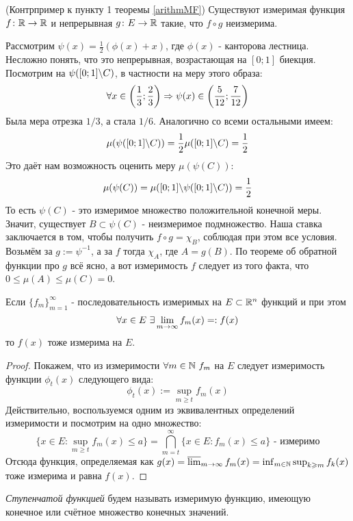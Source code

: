 \begin{example} (Контрпример к пункту 1 теоремы \ref{arithmMF})
	Существуют измеримая функция $f \colon \mathbb{R} \to \mathbb{R}$ и непрерывная $g \colon E \to \mathbb{R}$ такие, что $f \circ g$ неизмерима.
	
	Рассмотрим $\psi(x) = \frac{1}{2}(\phi(x) + x)$, где $\phi(x)$ - канторова лестница. Несложно понять, что это непрерывная, возрастающая на $[0; 1]$ биекция. Посмотрим на $\psi([0; 1] \backslash C)$, в частности на меру этого образа:
	\[
		\forall x \in \left(\frac{1}{3}; \frac{2}{3}\right) \Rightarrow \psi(x) \in \left(\frac{5}{12}; \frac{7}{12}\right)
	\]
	Была мера отрезка $1/3$, а стала $1/6$. Аналогично со всеми остальными имеем:
	\[
		\mu(\psi([0; 1] \backslash C)) = \frac{1}{2}\mu([0; 1] \backslash C) = \frac{1}{2}
	\]
	Это даёт нам возможность оценить меру $\mu(\psi(C))$:
	\[
		\mu(\psi(C)) = \mu([0; 1] \backslash \psi([0; 1] \backslash C)) = \frac{1}{2}
	\]
	То есть $\psi(C)$ - это измеримое множество положительной конечной меры. Значит, существует $B \subset \psi(C)$ - неизмеримое подмножество. Наша ставка заключается в том, чтобы получить $f \circ g = \chi_B$, соблюдая при этом все условия. Возьмём за $g := \psi^{-1}$, а за $f$ тогда $\chi_A$, где $A = g(B)$. По теореме об обратной функции про $g$ всё ясно, а вот измеримость $f$ следует из того факта, что $0 \le \mu(A) \le \mu(C) = 0$.
\end{example}

\begin{theorem}
	Если $\{f_m\}_{m = 1}^\infty$ - последовательность измеримых на $E \subset \mathbb{R}^n$ функций и при этом
	\[
		\forall x \in E\ \exists \lim\limits_{m \to \infty} f_m(x) =: f(x)
	\]
	то $f(x)$ тоже измерима на $E$.
\end{theorem}

\begin{proof}
	Покажем, что из измеримости $\forall m \in \mathbb{N}\ f_m$ на $E$ следует измеримость функции $\phi_t(x)$ следующего вида:
	\[
		\phi_t(x) := \sup_{m \ge t} f_m(x)
	\]
	Действительно, воспользуемся одним из эквивалентных определений измеримости и посмотрим на одно множество:
	\[
		\{x \in E \colon \sup_{m \ge t} f_m(x) \le a\} = \bigcap_{m = t}^\infty \{x \in E \colon f_m(x) \le a\} \text{ - измеримо}
	\]
	Отсюда функция, определяемая как $g(x) = \varlimsup_{m \to \infty} f_m(x) = \inf_{m \in \mathbb{N}} \sup_{k \geqslant m} f_k(x)$ тоже измерима и равна $f(x)$.
\end{proof}

\begin{definition}
	\textit{Ступенчатой функцией} будем называть измеримую функцию, имеющую конечное или счётное множество конечных значений.
\end{definition}

